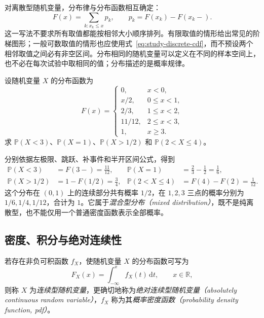 对离散型随机变量，分布律与分布函数相互确定：
\begin{equation}
  F(x)=\sum_{k:x_k\le x}p_k,\qquad
  p_k=F(x_k)-F(x_k-).
  \label{eq:study-discrete-cdf}
\end{equation}
这一写法不要求所有取值都能按相邻大小顺序排列。有限取值的情形给出常见的阶梯图形；一般可数取值的情形也应使用式~\eqref{eq:study-discrete-cdf}，而不预设两个相邻取值之间必有非空区间。分布相同的随机变量可以定义在不同的样本空间上，也不必在每次试验中取相同的值；分布描述的是概率规律。

\begin{example}
\label{ex:study-mixed-cdf}
设随机变量 $X$ 的分布函数为
\[
  F(x)=\begin{cases}
    0,&x<0,\\
    x/2,&0\le x<1,\\
    2/3,&1\le x<2,\\
    11/12,&2\le x<3,\\
    1,&x\ge3.
  \end{cases}
\]
求 $\mathbb P(X<3)$、$\mathbb P(X=1)$、$\mathbb P(X>1/2)$ 和 $\mathbb P(2<X\le4)$。
\end{example}

\begin{solve}
分别依据左极限、跳跃、补事件和半开区间公式，得到
\[
  \begin{aligned}
    \mathbb P(X<3)&=F(3-)=\frac{11}{12},&
    \mathbb P(X=1)&=\frac23-\frac12=\frac16,\\
    \mathbb P(X>1/2)&=1-F(1/2)=\frac34,&
    \mathbb P(2<X\le4)&=F(4)-F(2)=\frac1{12}.
  \end{aligned}
\]
这个分布在 $(0,1)$ 上的连续部分共有概率 $1/2$，在 $1,2,3$ 三点的概率分别为 $1/6,1/4,1/12$，合计为 $1$。它属于\emph{混合型分布（mixed distribution）}，既不是纯离散型，也不能仅用一个普通密度函数表示全部概率。
\end{solve}

\subsection{密度、积分与绝对连续性}
\label{subsec:study-density}

\begin{definition}
\label{def:study-density}
若存在非负可积函数 $f_X$，使随机变量 $X$ 的分布函数可写为
\begin{equation}
  F_X(x)=\int_{-\infty}^{x}f_X(t)\,\mathrm dt,
  \qquad x\in\mathbb R,
  \label{eq:study-density-definition}
\end{equation}
则称 $X$ 为\emph{连续型随机变量}，更确切地称为\emph{绝对连续型随机变量（absolutely continuous random variable）}，$f_X$ 称为其\emph{概率密度函数（probability density function, pdf）}。
\end{definition}

